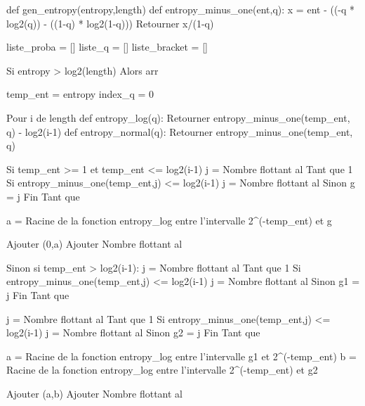 \documentclass[10pt,a4paper]{article}
\begin{document}
        \begin{algorithm}[caption={Integer division.}, label={alg1}]
def gen_entropy(entropy,length)
    def entropy_minus_one(ent,q):
        x = ent - ((-q * log2(q)) - ((1-q) * log2(1-q)))
        Retourner x/(1-q)

    liste_proba = []
    liste_q = []
    liste_bracket = []

    Si entropy > log2(length)
        Alors arr%
    
    temp_ent = entropy
    index_q = 0

    Pour i de length %
        def entropy_log(q):
            Retourner entropy_minus_one(temp_ent, q) - log2(i-1)
        def entropy_normal(q):
            Retourner entropy_minus_one(temp_ent, q)

        Si temp_ent >= 1 et temp_ent <= log2(i-1)
            j = Nombre flottant al%
            Tant que 1
                Si entropy_minus_one(temp_ent,j) <= log2(i-1)
                    j = Nombre flottant al%
                Sinon
                    g = j
                    Fin Tant que
            
            a = Racine de la fonction entropy_log entre l'intervalle 2^(-temp_ent) et g

            Ajouter (0,a) %
            Ajouter Nombre flottant al%

        Sinon si temp_ent > log2(i-1):
            j = Nombre flottant al%
            Tant que 1
                Si entropy_minus_one(temp_ent,j) <= log2(i-1)
                    j = Nombre flottant al%
                Sinon
                    g1 = j
                    Fin Tant que

            j = Nombre flottant al%
            Tant que 1
                Si entropy_minus_one(temp_ent,j) <= log2(i-1)
                    j = Nombre flottant al%
                Sinon
                    g2 = j
                    Fin Tant que

            a = Racine de la fonction entropy_log entre l'intervalle g1 et 2^(-temp_ent)
            b = Racine de la fonction entropy_log entre l'intervalle 2^(-temp_ent) et g2

            Ajouter (a,b) %
            Ajouter Nombre flottant al%


\end{algorithm}
\end{document}
